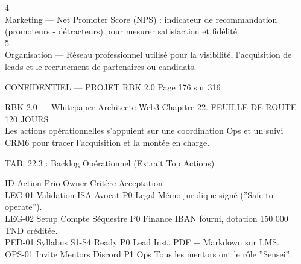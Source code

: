 \documentclass[12pt,landscape,a4paper]{article}
\newenvironment{confidential}
{\begin{tcolorbox}[
    colback=rbkred!5!white,
    colframe=rbkred!75!black,
    title=CONFIDENTIEL,
    fonttitle=\bfseries\color{white},
    coltitle=rbkred!75!black,
    breakable,
    enhanced,
    frame hidden,
    borderline west={2pt}{0pt}{rbkred!75!black}
]}
{\end{tcolorbox}}
\begin{document}
4\\
Marketing — Net Promoter Score (NPS) : indicateur de recommandation (promoteurs - détracteurs) pour mesurer satisfaction et fidélité.\\
5\\
Organisation — Réseau professionnel utilisé pour la visibilité, l’acquisition de leads et le recrutement de partenaires ou candidats.\\
\vspace{0.5em}
\vspace{0.5em}
\begin{confidential}CONFIDENTIEL — PROJET RBK 2.0                                           Page 176 sur 316\end{confidential}
RBK 2.0 — Whitepaper Architecte Web3                                                                              Chapitre 22. FEUILLE DE ROUTE 120 JOURS\\
\vspace{0.5em}
\vspace{0.5em}
Les actions opérationnelles s’appuient sur une coordination Ops et un suivi CRM6 pour tracer l’acquisition et la montée en charge.\\
\vspace{0.5em}
\begin{center}\begin{tabular}TAB. 22.3 : Backlog Opérationnel (Extrait Top Actions)\end{tabular}\end{center}
\vspace{0.5em}
\vspace{0.5em}
ID        Action                     Prio Owner        Critère Acceptation\\
\vspace{0.5em}
LEG-01 Validation ISA Avocat          P0 Legal         Mémo juridique signé (”Safe to operate”).\\
\vspace{0.5em}
LEG-02 Setup Compte Séquestre P0 Finance               IBAN fourni, dotation 150 000 TND créditée.\\
\vspace{0.5em}
PED-01 Syllabus S1-S4 Ready           P0 Lead Inst. PDF + Markdown sur LMS.\\
\vspace{0.5em}
OPS-01 Invite Mentors Discord         P1 Ops           Tous les mentors ont le rôle ”Sensei”.\\
\vspace{0.5em}
\vspace{0.5em}
\end{document}
